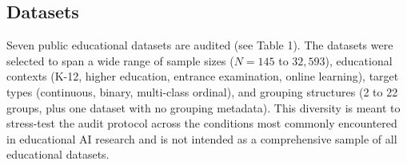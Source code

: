 \subsection{Datasets}
Seven public educational datasets are audited (see Table 1). The datasets were selected to span a wide range of sample sizes ($N = 145$ to $32{,}593$), educational contexts (K-12, higher education, entrance examination, online learning), target types (continuous, binary, multi-class ordinal), and grouping structures (2 to 22 groups, plus one dataset with no grouping metadata). This diversity is meant to stress-test the audit protocol across the conditions most commonly encountered in educational AI research and is not intended as a comprehensive sample of all educational datasets.

\begin{table}[H]
\centering
\caption{Overview of the seven audited educational datasets.}
\label{tab:dataset_overview}
%
\end{table}

